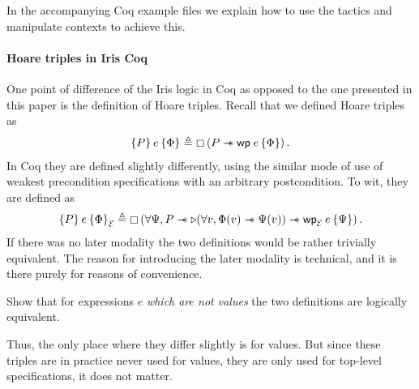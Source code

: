 In the accompanying Coq example files we explain how to use the tactics and manipulate contexts to achieve this.

\paragraph*{Hoare triples in Iris Coq}
One point of difference of the Iris logic in Coq as opposed to the one presented in this paper is the definition of Hoare triples.
Recall that we defined Hoare triples as
\begin{align*}
  \hoare{P}{e}{\Phi} \eqdef \persistently\left(P \wand \wpre{e}{\Phi}\right).
\end{align*}
In Coq they are defined slightly differently, using the similar mode of use of weakest precondition specifications with an arbitrary postcondition.
To wit, they are defined as
\begin{align*}
  \hoare{P}{e}{\Phi}[\mask] \eqdef \persistently\left(\forall \Psi, P \wand \later(\forall v, \Phi(v) \wand \Psi(v)) \wand \wpre{e}[\mask]{\Psi}\right).
\end{align*}
If there was no later modality the two definitions would be rather trivially equivalent.
The reason for introducing the later modality is technical, and it is there purely for reasons of convenience.
\begin{exercise}
  Show that for expressions $e$ \emph{which are not values} the two definitions are logically equivalent.
\end{exercise}

Thus, the only place where they differ slightly is for values.
But since these triples are in practice never used for values, they are only used for top-level specifications, it does not matter.

